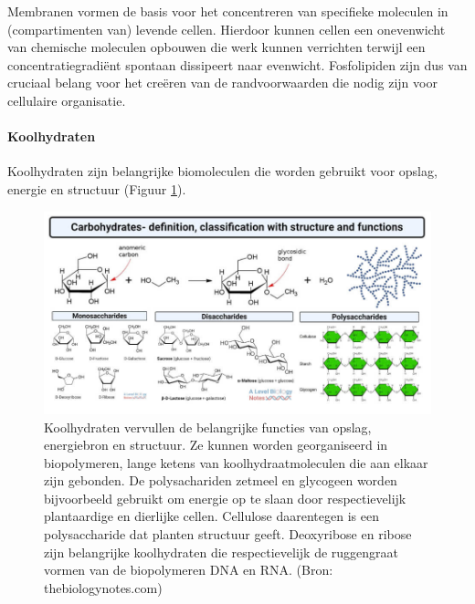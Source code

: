 \documentclass[
  11pt,
]{book}
\begin{document}
Membranen vormen de basis voor het concentreren van specifieke moleculen in (compartimenten van) levende cellen. Hierdoor kunnen cellen een onevenwicht van chemische moleculen opbouwen die werk kunnen verrichten terwijl een concentratiegradiënt spontaan dissipeert naar evenwicht. Fosfolipiden zijn dus van cruciaal belang voor het creëren van de randvoorwaarden die nodig zijn voor cellulaire organisatie.

\hypertarget{koolhydraten}{%
\paragraph{Koolhydraten}\label{koolhydraten}}

Koolhydraten zijn belangrijke biomoleculen die worden gebruikt voor opslag, energie en structuur (Figuur \ref{fig:carbohydrates}).

\begin{figure}

{\centering \includegraphics[width=1\linewidth]{./figs/Carbohydrates-definition-classification-with-structure-and-functions} 

}

\caption{Koolhydraten vervullen de belangrijke functies van opslag, energiebron en structuur. Ze kunnen worden georganiseerd in biopolymeren, lange ketens van koolhydraatmoleculen die aan elkaar zijn gebonden. De polysachariden zetmeel en glycogeen worden bijvoorbeeld gebruikt om energie op te slaan door respectievelijk plantaardige en dierlijke cellen. Cellulose daarentegen is een polysaccharide dat planten structuur geeft. Deoxyribose en ribose zijn belangrijke koolhydraten die respectievelijk de ruggengraat vormen van de biopolymeren DNA en RNA. (Bron: thebiologynotes.com)}\label{fig:carbohydrates}
\end{figure}
\end{document}
